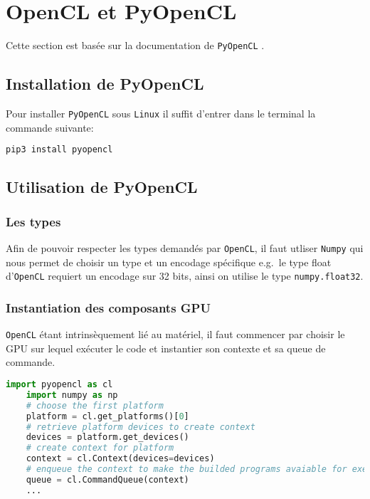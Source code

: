 \section{OpenCL et PyOpenCL}\label{sec:pyopencl}

Cette section est basée sur la documentation de \texttt{PyOpenCL} \autocite{pyopencl}.

\subsection{Installation de PyOpenCL}
Pour installer \texttt{PyOpenCL} sous \texttt{Linux} il suffit d'entrer dans 
le terminal la commande suivante:
\begin{lstlisting}[language=sh]
    pip3 install pyopencl  
\end{lstlisting}


\subsection{Utilisation de PyOpenCL}

\subsubsection{Les types}

Afin de pouvoir respecter les types demandés par \texttt{OpenCL}, il faut 
utliser \texttt{Numpy} qui nous permet de choisir un type et un encodage spécifique 
e.g.\ le type float d'\texttt{OpenCL} requiert un encodage sur 32 bits, ainsi 
on utilise le type \texttt{numpy.float32}.

\subsubsection{Instantiation des composants GPU}

\texttt{OpenCL} étant intrinsèquement lié au matériel, il faut commencer par choisir 
le GPU sur lequel exécuter le code et instantier son contexte et sa queue 
de commande.

\begin{lstlisting}[language=python]
    import pyopencl as cl
    import numpy as np
    # choose the first platform 
    platform = cl.get_platforms()[0]       
    # retrieve platform devices to create context
    devices = platform.get_devices()        
    # create context for platform
    context = cl.Context(devices=devices)    
    # enqueue the context to make the builded programs avaiable for execution
    queue = cl.CommandQueue(context)
    ...
\end{lstlisting}

